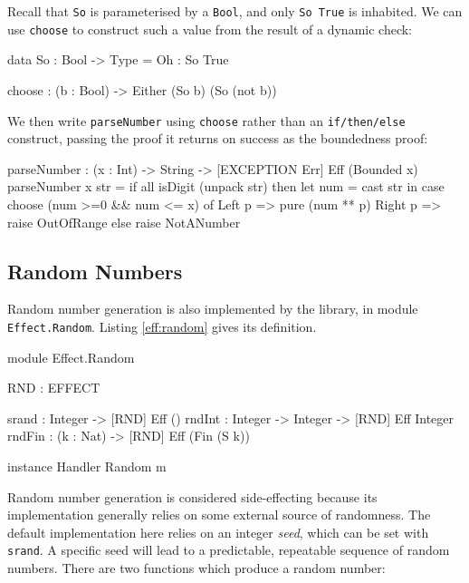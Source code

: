 \noindent
Recall that \texttt{So} is parameterised by a \texttt{Bool}, and only
\texttt{So True} is inhabited. We can use \texttt{choose} to construct such
a value from the result of a dynamic check:

\begin{code}
data So : Bool -> Type = Oh : So True

choose : (b : Bool) -> Either (So b) (So (not b))
\end{code}

\noindent
We then write \texttt{parseNumber} using \texttt{choose} rather than
an \texttt{if/then/else} construct, passing the proof it returns on success
as the boundedness proof:

\begin{code}
parseNumber : (x : Int) -> String -> { [EXCEPTION Err] } Eff (Bounded x)
parseNumber x str
   = if all isDigit (unpack str)
        then let num = cast str in
             case choose (num >=0 && num <= x) of
                  Left p => pure (num ** p)
                  Right p => raise OutOfRange
        else raise NotANumber
\end{code}

%

\subsection{Random Numbers}

Random number generation is also implemented by the \effects{} library,
in module \texttt{Effect.Random}. Listing \ref{eff:random} gives its
definition.

\begin{code}[float=h,frame=single,label=eff:random,caption={Random Number Effect}]
module Effect.Random

RND : EFFECT

srand  : Integer ->            { [RND] } Eff ()
rndInt : Integer -> Integer -> { [RND] } Eff Integer
rndFin : (k : Nat) ->          { [RND] } Eff (Fin (S k))

instance Handler Random m
\end{code}

Random number generation is considered side-effecting because its implementation
generally relies on some external source of randomness. The default 
implementation here relies on an integer \emph{seed}, which can be set with
\texttt{srand}. A specific seed will lead to a predictable, repeatable
sequence of random numbers. There are two functions which produce a random
number:

